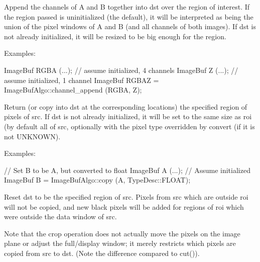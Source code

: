 Append the channels of {\cf A} and {\cf B} together into {\cf dst} over
the region of interest.  If the region passed is uninitialized (the
default), it will be interpreted as being the union of the pixel windows
of {\cf A} and {\cf B} (and all channels of both images).  If {\cf dst}
is not already initialized, it will be resized to be big enough for the
region.

\smallskip
\noindent Examples:
\begin{code}
    ImageBuf RGBA (...);   // assume initialized, 4 channels
    ImageBuf Z (...);      // assume initialized, 1 channel
    ImageBuf RGBAZ = ImageBufAlgo::channel_append (RGBA, Z);
\end{code}
\apiend


 

Return (or copy into {\cf dst} at the corresponding locations) the specified
region of pixels of {\cf src}.  If {\cf dst} is not already initialized, it
will be set to the same size as {\cf roi} (by default all of {\cf src},
optionally with the pixel type overridden by {\cf convert} (if it is not
{\cf UNKNOWN}).

\smallskip
\noindent Examples:
\begin{code}
    // Set B to be A, but converted to float
    ImageBuf A (...);  // Assume initialized
    ImageBuf B = ImageBufAlgo::copy (A, TypeDesc::FLOAT);
\end{code}
\apiend


 
Reset {\cf dst} to be the specified region of {\cf src}.
Pixels from {\cf src} which are outside {\cf roi} will not be copied, and
new black pixels will be added for regions of {\cf roi} which were outside
the data window of {\cf src}.

Note that the {\cf crop} operation does not actually move the pixels on the
image plane or adjust the full/display window; it merely restricts which
pixels are copied from {\cf src} to {\cf dst}.  (Note the difference
compared to {\cf cut()}).

